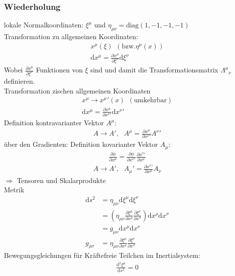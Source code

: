 \documentclass[a4paper]{article}
\begin{document}
\subsubsection{Wiederholung}
lokale Normalkoordinaten: $\xi^\mu$ und
$\eta_{\mu\nu}=\text{diag}(1,-1,-1,-1)$\\
Transformation zu allgemeinen Koordinaten:
\begin{align}
x^\mu(\xi) \ \ (\text{bzw.} \eta^\mu(x))\\
\mathrm{d}x^\mu=\frac{\partial x^\mu}{\partial \xi^\nu} \mathrm{d}\xi^\nu 
\end{align}
Wobei $\frac{\partial x^\mu}{\partial \xi^\nu}$ Funktionen von $\xi$ sind und
damit die Transformationsmatrix $\Lambda^\mu{}_\nu$ definieren.\\
Transformation zischen allgemeinen Koordinaten
\begin{align}
x^\mu \rightarrow x^\mu{}'(x) \ \ (\text{umkehrbar})\\
\mathrm{d}x^\mu=\frac{\partial x^\mu}{\partial x^\nu{}'} \mathrm{d}x^\nu{}' 
\end{align}
Definition kontravarianter Vektor $A^\mu$:
\begin{align}
A\rightarrow A',\ \ \ A^\mu=\frac{\partial x^\mu}{\partial x^\nu{}'}A^\nu{}'
\end{align}
über den Gradienten:
Definition kovarianter Vektor $A_\mu$:
\begin{align}
\frac{\partial \phi}{\partial x^\mu}=\frac{\partial \phi}{\partial
x^\nu{}'}\frac{\partial x^\nu{}'}{\partial x^\mu{}}
\end{align}
\begin{align}
A\rightarrow A',\ \ \ A_\mu{}'=\frac{\partial x^\nu{}'}{\partial x^\mu}A_\nu
\end{align}
$\Rightarrow$ Tensoren und Skalarprodukte\\
Metrik
\begin{align}
\mathrm{d}s^2&=\eta_{\mu\nu}\mathrm{d}\xi^\mu\mathrm{d}\xi^\nu\\
&=\left( \eta_{\mu\nu} \frac{\partial \xi^\mu}{\partial x^\rho}\frac{\partial
\xi^\nu}{\partial x^\sigma} \right)\mathrm{d}x^\rho\mathrm{d}x^\sigma\\
&=g_{\mu\nu}\mathrm{d}x^\mu\mathrm{d}x^\nu\\
g_{\rho\sigma}&=\eta_{\mu\nu} \frac{\partial \xi^\mu}{\partial
x^\rho}\frac{\partial \xi^\nu}{\partial x^\sigma}
\end{align}
Bewegungsgleichungen für Kräftefreie Teilchen im Inertialsystem: 
\begin{align}
\frac{\mathrm{d}^2\xi^\mu}{\mathrm{d}s^2}=0
\end{align}
\end{document}

